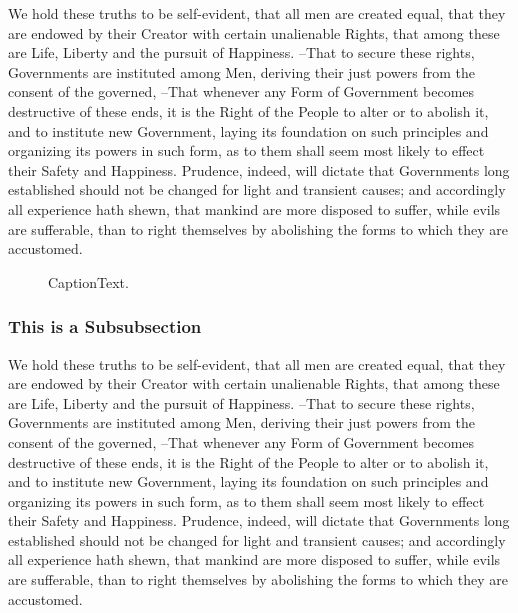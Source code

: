 We hold these truths to be self-evident, that all men are created equal,  that they are endowed by their Creator with certain unalienable Rights,  that among these are Life, Liberty and the pursuit of Happiness. --That to secure these  rights, Governments are instituted among Men, deriving their just powers  from the consent of the governed, --That whenever any Form of Government  becomes destructive of these ends, it is the Right of the People to alter  or to abolish it, and to institute new Government, laying its foundation on  such principles and organizing its powers in such form, as to them shall  seem most likely to effect their Safety and Happiness. Prudence, indeed, will dictate that Governments long established should not  be changed for light and transient causes; and accordingly all experience  hath shewn, that mankind are more disposed to suffer, while evils are  sufferable, than to right themselves by abolishing the forms to which they  are accustomed.\cite{DaviesMoon-1993-3-D-Spatial-Cha-0,Tonkin-1980-A-Basic-Attitud-0,Matsumoto-1984-A-Chaotic-Attra-0,MacKay-1988-A-Criterion-for-0,FreundNix-1996-A-Critical-Thic-0,MarsdenHolmes-1979-A-Horseshoe-in--0,Koiller-1984-A-Mechanical-Sy-0,TsiotrasLonguski-1995-A-New-Parameter-0,ShimadaNagashima-1979-A-Numerical-App-0,SmithDavenport-1988-A-Perturbation--0,Ketema-1992-A-Physical-Inte-0,GraesserCozzarelli-1994-A-Proposed-Thre-0,RichardsonMitchell-1999-A-Simplified-Va-0,MitchellRichardson-1999-A-Simplified-Va-0,Parks-1967-A-Stability-Cri-0,HsuLee-1971-A-Stability-Stu-0,BhattacharyaJames-1999-A-Theory-of-Thi-0,RimrottJanabi-Sharifi-1992-A-Torque-Free-F-0,Muller-PfeifferKranenburg-1992-A-Two-Dimension-0,HashinShtrikman-1963-A-Variational-A-0,Junkins-1997-Adventures-on-t-0}
\begin{figure}[htb]
    \centering
    \caption{CaptionText.}
    \label{ChX-figure: FigureLabel}
\end{figure}

\subsubsection{This is a Subsubsection}

We hold these truths to be self-evident, that all men are created equal,  that they are endowed by their Creator with certain unalienable Rights,  that among these are Life, Liberty and the pursuit of Happiness. --That to secure these  rights, Governments are instituted among Men, deriving their just powers  from the consent of the governed, --That whenever any Form of Government  becomes destructive of these ends, it is the Right of the People to alter  or to abolish it, and to institute new Government, laying its foundation on  such principles and organizing its powers in such form, as to them shall  seem most likely to effect their Safety and Happiness. Prudence, indeed, will dictate that Governments long established should not  be changed for light and transient causes; and accordingly all experience  hath shewn, that mankind are more disposed to suffer, while evils are  sufferable, than to right themselves by abolishing the forms to which they  are accustomed.

